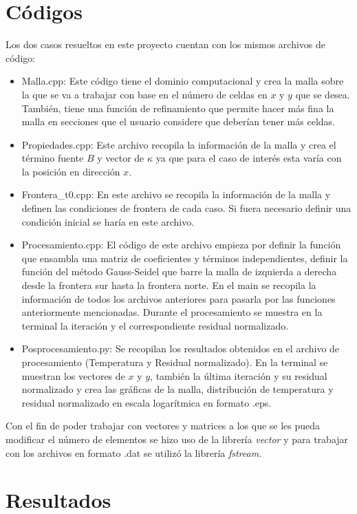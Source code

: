 \documentclass[article,latterpaper]{IEEEtran}
\begin{document}
\section{Códigos}
Los dos casos resueltos en este proyecto cuentan con los mismos archivos de código:

\begin{itemize}
	\item Malla.cpp: Este código tiene el dominio computacional y crea la malla sobre la que se va a trabajar con base en el número de celdas en $x$ y $y$ que se desea. También, tiene una función de refinamiento que permite hacer más fina la malla en secciones que el usuario considere que deberían tener más celdas.
	\item Propiedades.cpp: Este archivo recopila la información de la malla y crea el término fuente $B$ y vector de $\kappa$ ya que para el caso de interés esta varía con la posición en dirección $x$.
	\item Frontera\_t0.cpp: En este archivo se recopila la información de la malla y definen las condiciones de frontera de cada caso. Si fuera necesario definir una condición inicial se haría en este archivo.
	\item Procesamiento.cpp: El código de este archivo empieza por definir la función que ensambla una matriz de coeficientes y términos independientes, definir la función del método Gauss-Seidel que barre la malla de izquierda a derecha desde la frontera sur hasta la frontera norte. En el main se recopila la información de todos los archivos anteriores para pasarla por las funciones anteriormente mencionadas. Durante el procesamiento se muestra en la terminal la iteración y el correspondiente residual normalizado.
	\item Posprocesamiento.py: Se recopilan los resultados obtenidos en el archivo de procesamiento (Temperatura y Residual normalizado). En la terminal se muestran los vectores de $x$ y $y$, también la última iteración y su residual normalizado y crea las gráficas de la malla, distribución de temperatura y residual normalizado en escala logarítmica en formato .eps.
\end{itemize}
	
Con el fin de poder trabajar con vectores y matrices a los que se les pueda modificar el número de elementos se hizo uso de la librería \textit{vector} y para trabajar con los archivos en formato .dat se utilizó la librería \textit{fstream}.

\section{Resultados}
\end{document}

